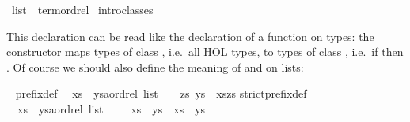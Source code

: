 %
\begin{isabellebody}%
\def\isabellecontext{Overloading}%
\ list\ {\isacharcolon}{\isacharcolon}\ {\isacharparenleft}{\isachardoublequote}term{\isachardoublequote}{\isacharparenright}ordrel\isanewline
{}\ intro{\isacharunderscore}classes%
\begin{isamarkuptext}%
\noindent
This  declaration can be read like the declaration of
a function on types: the constructor  maps types of class , i.e.\ all HOL types, to types of class , i.e.\
if  then .
Of course we should also define the meaning of \isa{{\isacharless}{\isacharless}{\isacharequal}} and
\isa{{\isacharless}{\isacharless}} on lists:%
\end{isamarkuptext}%
\ {\isacharparenleft}\isanewline
prefix{\isacharunderscore}def{\isacharcolon}\isanewline
\ \ {\isachardoublequote}xs\ {\isacharless}{\isacharless}{\isacharequal}\ {\isacharparenleft}ys{\isacharcolon}{\isacharcolon}{\isacharprime}a{\isacharcolon}{\isacharcolon}ordrel\ list{\isacharparenright}\ \ {\isasymequiv}\ \ {\isasymexists}zs{\isachardot}\ ys\ {\isacharequal}\ xs{\isacharat}zs{\isachardoublequote}\isanewline
strict{\isacharunderscore}prefix{\isacharunderscore}def{\isacharcolon}\isanewline
\ \ {\isachardoublequote}xs\ {\isacharless}{\isacharless}\ {\isacharparenleft}ys{\isacharcolon}{\isacharcolon}{\isacharprime}a{\isacharcolon}{\isacharcolon}ordrel\ list{\isacharparenright}\ \ \ {\isasymequiv}\ \ xs\ {\isacharless}{\isacharless}{\isacharequal}\ ys\ {\isasymand}\ xs\ {\isasymnoteq}\ ys{\isachardoublequote}\end{isabellebody}%
